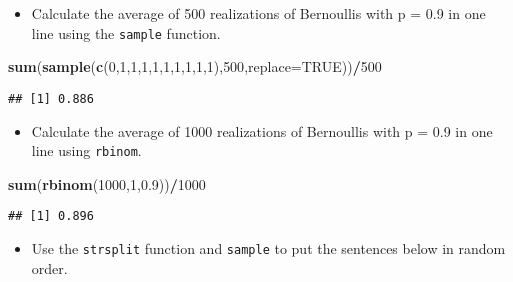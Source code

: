 \documentclass[]{article}
\newenvironment{Shaded}{\begin{snugshade}}{\end{snugshade}}
\newcommand{\KeywordTok}[1]{\textcolor[rgb]{0.13,0.29,0.53}{\textbf{#1}}}
\newcommand{\DataTypeTok}[1]{\textcolor[rgb]{0.13,0.29,0.53}{#1}}
\newcommand{\DecValTok}[1]{\textcolor[rgb]{0.00,0.00,0.81}{#1}}
\newcommand{\FloatTok}[1]{\textcolor[rgb]{0.00,0.00,0.81}{#1}}
\newcommand{\OtherTok}[1]{\textcolor[rgb]{0.56,0.35,0.01}{#1}}
\newcommand{\OperatorTok}[1]{\textcolor[rgb]{0.81,0.36,0.00}{\textbf{#1}}}
\newcommand{\NormalTok}[1]{#1}
\providecommand{\tightlist}{%
  \setlength{\itemsep}{0pt}\setlength{\parskip}{0pt}}
\begin{document}
\begin{itemize}
\tightlist
\item
  Calculate the average of 500 realizations of Bernoullis with p = 0.9
  in one line using the \texttt{sample} function.
\end{itemize}

\begin{Shaded}
\begin{Highlighting}[]
\KeywordTok{sum}\NormalTok{(}\KeywordTok{sample}\NormalTok{(}\KeywordTok{c}\NormalTok{(}\DecValTok{0}\NormalTok{,}\DecValTok{1}\NormalTok{,}\DecValTok{1}\NormalTok{,}\DecValTok{1}\NormalTok{,}\DecValTok{1}\NormalTok{,}\DecValTok{1}\NormalTok{,}\DecValTok{1}\NormalTok{,}\DecValTok{1}\NormalTok{,}\DecValTok{1}\NormalTok{,}\DecValTok{1}\NormalTok{),}\DecValTok{500}\NormalTok{,}\DataTypeTok{replace=}\OtherTok{TRUE}\NormalTok{))}\OperatorTok{/}\DecValTok{500}
\end{Highlighting}
\end{Shaded}

\begin{verbatim}
## [1] 0.886
\end{verbatim}

\begin{itemize}
\tightlist
\item
  Calculate the average of 1000 realizations of Bernoullis with p = 0.9
  in one line using \texttt{rbinom}.
\end{itemize}

\begin{Shaded}
\begin{Highlighting}[]
\KeywordTok{sum}\NormalTok{(}\KeywordTok{rbinom}\NormalTok{(}\DecValTok{1000}\NormalTok{,}\DecValTok{1}\NormalTok{,}\FloatTok{0.9}\NormalTok{))}\OperatorTok{/}\DecValTok{1000}
\end{Highlighting}
\end{Shaded}

\begin{verbatim}
## [1] 0.896
\end{verbatim}

\begin{itemize}
\tightlist
\item
  Use the \texttt{strsplit} function and \texttt{sample} to put the
  sentences below in random order.
\end{itemize}
\end{document}
